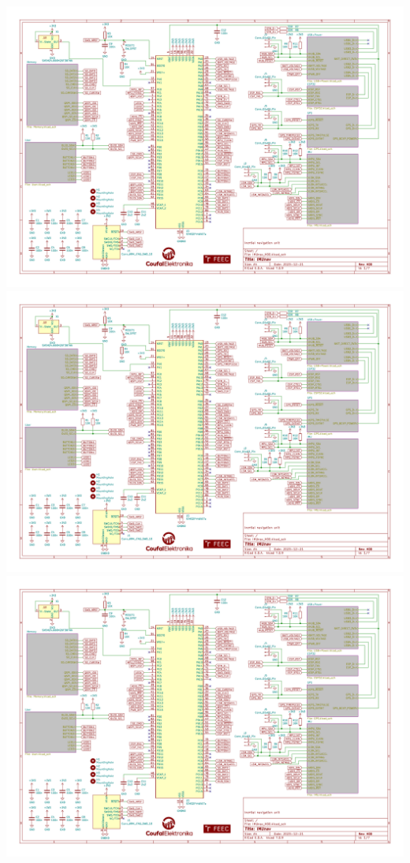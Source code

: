 \includegraphics[angle=90, page=5, width=\textwidth]{KiCad/schematic.pdf}
\includegraphics[angle=90, page=6, width=\textwidth]{KiCad/schematic.pdf}
\includegraphics[angle=90, page=7, width=\textwidth]{KiCad/schematic.pdf}

